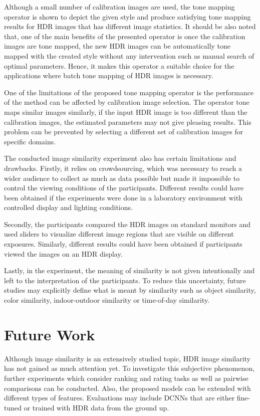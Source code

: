 Although a small number of calibration images are used, the tone mapping operator is shown to depict the given style and produce satisfying tone mapping results for HDR images that has different image statistics. It should be also noted that, one of the main benefits of the presented operator is once the calibration images are tone mapped, the new HDR images can be automatically tone mapped with the created style without any intervention such as manual search of optimal parameters. Hence, it makes this operator a suitable choice for the applications where batch tone mapping of HDR images is necessary.

One of the limitations of the proposed tone mapping operator is the performance of the method can be affected by calibration image selection. The operator tone maps similar images similarly, if the input HDR image is too different than the calibration images, the estimated parameters may not give pleasing results. This problem can be prevented by selecting a different set of calibration images for specific domains.

The conducted image similarity experiment also has certain limitations and drawbacks. Firstly, it relies on crowdsourcing, which was necessary to reach a wider audience to collect as much as data possible but made it impossible to control the viewing conditions of the participants. Different results could have been obtained if the experiments were done in a laboratory environment with controlled display and lighting conditions. 

Secondly, the participants compared the HDR images on standard monitors and used sliders to visualize different image regions that are visible on different exposures. Similarly, different results could have been obtained if participants viewed the images on an HDR display. 

Lastly, in the experiment, the meaning of similarity is not given intentionally and left to the interpretation of the participants. To reduce this uncertainty, future studies may explicitly define what is meant by similarity such as object similarity, color similarity, indoor-outdoor similarity or time-of-day similarity.

\section{Future Work}

Although image similarity is an extensively studied topic, HDR image similarity has not gained as much attention yet. To investigate this subjective phenomenon, further experiments which consider ranking and rating tasks as well as pairwise comparisons can be conducted. Also, the proposed models can be extended with different types of features. Evaluations may include DCNNs that are either fine-tuned or trained with HDR data from the ground up.

